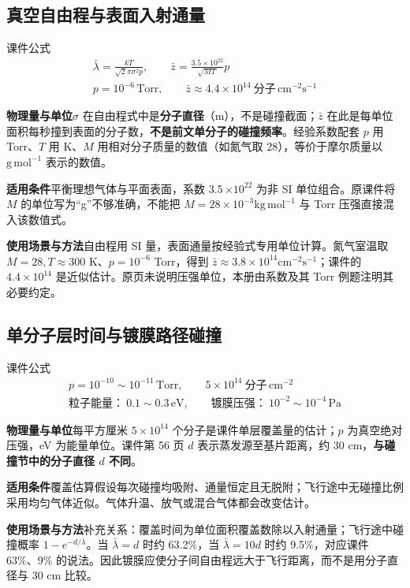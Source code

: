 \documentclass[UTF8,fontset=none,zihao=-4,a4paper]{ctexart}
\newcommand{\unit}[1]{\,\mathrm{#1}}
\newcommand{\explain}[3]{\par\noindent\textbf{物理量与单位}\quad #1\par
\noindent\textbf{适用条件}\quad #2\par
\noindent\textbf{使用场景与方法}\quad #3\par}
\begin{document}
\par\noindent\begin{minipage}{\linewidth}
\subsection{真空自由程与表面入射通量}
\begin{infobox}[breakable=false]{课件公式}
\begin{gather*}\bar\lambda=\frac{kT}{\sqrt2\pi\sigma^2p},\qquad\bar z=\frac{3.5\times10^{22}}{\sqrt{MT}}p\\p=10^{-6}\unit{Torr},\qquad\bar z\approx4.4\times10^{14}\ \text{分子}\,\mathrm{cm^{-2}s^{-1}}\end{gather*}
\end{infobox}
\end{minipage}\par
\explain{$\sigma$ 在自由程式中是\textbf{分子直径}（m），不是碰撞截面；$\bar z$ 在此是每单位面积每秒撞到表面的分子数，\textbf{不是前文单分子的碰撞频率}。经验系数配套 $p$ 用 Torr、$T$ 用 K、$M$ 用相对分子质量的数值（如氮气取 28），等价于摩尔质量以 $\mathrm{g\,mol^{-1}}$ 表示的数值。}{平衡理想气体与平面表面，系数 3.5\,$\times10^{22}$ 为非 SI 单位组合。原课件将 $M$ 的单位写为“g”不够准确，不能把 $M=28\times10^{-3}\mathrm{kg\,mol^{-1}}$ 与 Torr 压强直接混入该数值式。}{自由程用 SI 量，表面通量按经验式专用单位计算。氮气室温取 $M=28,T\approx300$ K、$p=10^{-6}$ Torr，得到 $\bar z\approx3.8\times10^{14}\mathrm{cm^{-2}s^{-1}}$；课件的 $4.4\times10^{14}$ 是近似估计。原页未说明压强单位，本册由系数及其 Torr 例题注明其必要约定。}


\par\noindent\begin{minipage}{\linewidth}
\subsection{单分子层时间与镀膜路径碰撞}
\begin{infobox}[breakable=false]{课件公式}
\begin{gather*}p=10^{-10}\sim10^{-11}\unit{Torr},\qquad5\times10^{14}\ \text{分子}\,\mathrm{cm^{-2}}\\\text{粒子能量：}\ 0.1\sim0.3\unit{eV},\qquad\text{镀膜压强：}\ 10^{-2}\sim10^{-4}\unit{Pa}\end{gather*}
\end{infobox}
\end{minipage}\par
\explain{每平方厘米 $5\times10^{14}$ 个分子是课件单层覆盖量的估计；$p$ 为真空绝对压强，eV 为能量单位。课件第 56 页 $d$ 表示蒸发源至基片距离，约 30 cm，\textbf{与碰撞节中的分子直径 $d$ 不同}。}{覆盖估算假设每次碰撞均吸附、通量恒定且无脱附；飞行途中无碰撞比例采用均匀气体近似。气体升温、放气或混合气体都会改变估计。}{补充关系：覆盖时间为单位面积覆盖数除以入射通量；飞行途中碰撞概率 $1-e^{-d/\bar\lambda}$。当 $\bar\lambda=d$ 时约 63.2\%，当 $\bar\lambda=10d$ 时约 9.5\%，对应课件 63\%、9\% 的说法。因此镀膜应使分子间自由程远大于飞行距离，而不是用分子直径与 30 cm 比较。}
\end{document}
